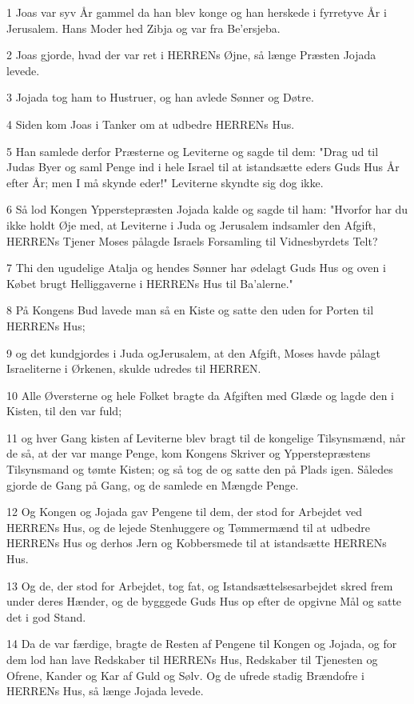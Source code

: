 \par 1 Joas var syv År gammel da han blev konge og han herskede i fyrretyve År i Jerusalem. Hans Moder hed Zibja og var fra Be'ersjeba.
\par 2 Joas gjorde, hvad der var ret i HERRENs Øjne, så længe Præsten Jojada levede.
\par 3 Jojada tog ham to Hustruer, og han avlede Sønner og Døtre.
\par 4 Siden kom Joas i Tanker om at udbedre HERRENs Hus.
\par 5 Han samlede derfor Præsterne og Leviterne og sagde til dem: "Drag ud til Judas Byer og saml Penge ind i hele Israel til at istandsætte eders Guds Hus År efter År; men I må skynde eder!" Leviterne skyndte sig dog ikke.
\par 6 Så lod Kongen Ypperstepræsten Jojada kalde og sagde til ham: "Hvorfor har du ikke holdt Øje med, at Leviterne i Juda og Jerusalem indsamler den Afgift, HERRENs Tjener Moses pålagde Israels Forsamling til Vidnesbyrdets Telt?
\par 7 Thi den ugudelige Atalja og hendes Sønner har ødelagt Guds Hus og oven i Købet brugt Helliggaverne i HERRENs Hus til Ba'alerne."
\par 8 På Kongens Bud lavede man så en Kiste og satte den uden for Porten til HERRENs Hus;
\par 9 og det kundgjordes i Juda ogJerusalem, at den Afgift, Moses havde pålagt Israeliterne i Ørkenen, skulde udredes til HERREN.
\par 10 Alle Øversterne og hele Folket bragte da Afgiften med Glæde og lagde den i Kisten, til den var fuld;
\par 11 og hver Gang kisten af Leviterne blev bragt til de kongelige Tilsynsmænd, når de så, at der var mange Penge, kom Kongens Skriver og Ypperstepræstens Tilsynsmand og tømte Kisten; og så tog de og satte den på Plads igen. Således gjorde de Gang på Gang, og de samlede en Mængde Penge.
\par 12 Og Kongen og Jojada gav Pengene til dem, der stod for Arbejdet ved HERRENs Hus, og de lejede Stenhuggere og Tømmermænd til at udbedre HERRENs Hus og derhos Jern og Kobbersmede til at istandsætte HERRENs Hus.
\par 13 Og de, der stod for Arbejdet, tog fat, og Istandsættelsesarbejdet skred frem under deres Hænder, og de bygggede Guds Hus op efter de opgivne Mål og satte det i god Stand.
\par 14 Da de var færdige, bragte de Resten af Pengene til Kongen og Jojada, og for dem lod han lave Redskaber til HERRENs Hus, Redskaber til Tjenesten og Ofrene, Kander og Kar af Guld og Sølv. Og de ufrede stadig Brændofre i HERRENs Hus, så længe Jojada levede.
